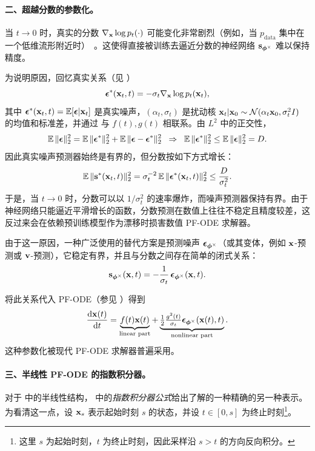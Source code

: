 \paragraph{二、超越分数的参数化。}
当 $t \to 0$ 时，真实的分数 $\nabla_{{\mathbf{x}}}\log p_t(\cdot)$ 可能变化非常剧烈（例如，当 $p_{\text{data}}$ 集中在一个低维流形附近时）~\citep{kim2022soft}。这使得直接被训练去逼近分数的神经网络 ${\mathbf{s}}_{{\bm{\phi}}^\times}$ 难以保持精度。

为说明原因，回忆真实关系（见 ）
\[
{\bm{\epsilon}}^*({\mathbf{x}}_t,t) = -\sigma_t \nabla_{{\mathbf{x}}}\log p_t({\mathbf{x}}_t),
\]
其中 ${\bm{\epsilon}}^*({\mathbf{x}}_t,t)=\mathbb{E}[{\bm{\epsilon}} |{\mathbf{x}}_t]$ 是真实噪声，$(\alpha_t,\sigma_t)$ 是扰动核
${\mathbf{x}}_t |{\mathbf{x}}_0 \sim \mathcal{N}(\alpha_t {\mathbf{x}}_0, \sigma_t^2 I)$
的均值和标准差，并通过  与 $f(t),g(t)$ 相联系。由 $L^2$ 中的正交性，
\[
\mathbb{E}\,\|{\bm{\epsilon}}\|_2^2
=\mathbb{E}\,\|{\bm{\epsilon}}^*\|_2^2+\mathbb{E}\,\|{\bm{\epsilon}}-{\bm{\epsilon}}^*\|_2^2
\;\;\Rightarrow\;\;
\mathbb{E}\,\|{\bm{\epsilon}}^*\|_2^2 \leq \mathbb{E}\,\|{\bm{\epsilon}}\|_2^2 = D.
\]
因此真实噪声预测器始终是有界的，但分数按如下方式增长：
\[
\mathbb{E}\,\|{\mathbf{s}}^*({\mathbf{x}}_t,t)\|_2^2
= \sigma_t^{-2}\,\mathbb{E}\,\|{\bm{\epsilon}}^*({\mathbf{x}}_t,t)\|_2^2
 \leq  \frac{D}{\sigma_t^2}.
\]
于是，当 $t\to 0$ 时，分数可以以 $1/\sigma_t^2$ 的速率爆炸，而噪声预测器保持有界。由于神经网络只能逼近平滑增长的函数，分数预测在数值上往往不稳定且精度较差，这反过来会在依赖预训练模型作为漂移时损害数值 PF-ODE 求解器。

由于这一原因，一种广泛使用的替代方案是预测噪声 ${\bm{\epsilon}}_{\bm{\phi}^\times}$（或其变体，例如 ${\mathbf{x}}$-预测或 ${\mathbf{v}}$-预测），它稳定有界，并且与分数之间存在简单的闭式关系：
\[
{\mathbf{s}}_{\bm{\phi}^\times}({\mathbf{x}},t) = -\frac{1}{\sigma_t}\,{\bm{\epsilon}}_{\bm{\phi}^\times}({\mathbf{x}},t).
\]



将此关系代入 PF-ODE（参见 ）得到
\begin{equation}\label{eq:noise_pf_ode}
\frac{\mathop{}\!\mathrm{d}{\mathbf{x}}(t)}{\mathop{}\!\mathrm{d} t}
 = 
\underbrace{f(t) {\mathbf{x}}(t)}_{\text{linear part}}
 + 
\underbrace{\tfrac{1}{2} \tfrac{g^2(t)}{\sigma_t} {\bm{\epsilon}}_{\bm{\phi}^\times}({\mathbf{x}}(t), t)}_{\text{nonlinear part}}.
\end{equation}
这种参数化被现代 PF-ODE 求解器普遍采用。

\paragraph{三、半线性 PF-ODE 的指数积分器。}
对于  中的半线性结构， 中的\emph{指数积分器公式}给出了解的一种精确的另一种表示。
为看清这一点，设 ${\mathbf{x}}_s$ 表示起始时刻 $s$ 的状态，并设 $t\in[0,s]$ 为终止时刻\footnote{这里 $s$ 为起始时刻，$t$ 为终止时刻，因此采样沿 $s>t$ 的方向反向积分。}。

